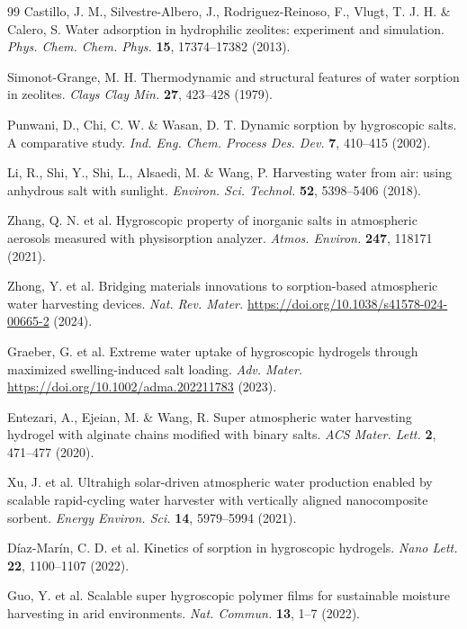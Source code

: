 \documentclass[11pt]{article}
\begin{document}
\begin{thebibliography}{99}
 Castillo, J. M., Silvestre-Albero, J., Rodriguez-Reinoso, F., Vlugt, T. J. H. \& Calero, S. Water adsorption in hydrophilic zeolites: experiment and simulation. \textit{Phys. Chem. Chem. Phys.} \textbf{15}, 17374--17382 (2013).

 Simonot-Grange, M. H. Thermodynamic and structural features of water sorption in zeolites. \textit{Clays Clay Min.} \textbf{27}, 423--428 (1979).

 Punwani, D., Chi, C. W. \& Wasan, D. T. Dynamic sorption by hygroscopic salts. A comparative study. \textit{Ind. Eng. Chem. Process Des. Dev.} \textbf{7}, 410--415 (2002).

 Li, R., Shi, Y., Shi, L., Alsaedi, M. \& Wang, P. Harvesting water from air: using anhydrous salt with sunlight. \textit{Environ. Sci. Technol.} \textbf{52}, 5398--5406 (2018).

 Zhang, Q. N. et al. Hygroscopic property of inorganic salts in atmospheric aerosols measured with physisorption analyzer. \textit{Atmos. Environ.} \textbf{247}, 118171 (2021).

 Zhong, Y. et al. Bridging materials innovations to sorption-based atmospheric water harvesting devices. \textit{Nat. Rev. Mater.} \url{https://doi.org/10.1038/s41578-024-00665-2} (2024).

 Graeber, G. et al. Extreme water uptake of hygroscopic hydrogels through maximized swelling-induced salt loading. \textit{Adv. Mater.} \url{https://doi.org/10.1002/adma.202211783} (2023).

 Entezari, A., Ejeian, M. \& Wang, R. Super atmospheric water harvesting hydrogel with alginate chains modified with binary salts. \textit{ACS Mater. Lett.} \textbf{2}, 471--477 (2020).

 Xu, J. et al. Ultrahigh solar-driven atmospheric water production enabled by scalable rapid-cycling water harvester with vertically aligned nanocomposite sorbent. \textit{Energy Environ. Sci.} \textbf{14}, 5979--5994 (2021).

 D\'iaz-Mar\'in, C. D. et al. Kinetics of sorption in hygroscopic hydrogels. \textit{Nano Lett.} \textbf{22}, 1100--1107 (2022).

 Guo, Y. et al. Scalable super hygroscopic polymer films for sustainable moisture harvesting in arid environments. \textit{Nat. Commun.} \textbf{13}, 1--7 (2022).


\end{thebibliography}
\end{document}
